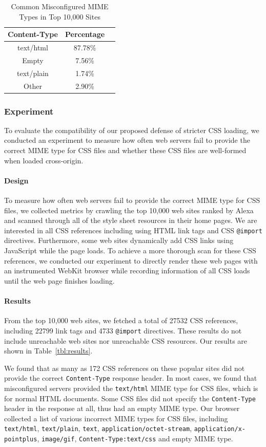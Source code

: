 \documentclass{acm_proc_article-sp}
\begin{document}
\begin{table}
\centering
\begin{tabular}{|c|c|c|} \hline
Content-Type&Percentage\\ \hline
text/html&87.78\%\\ \hline
Empty&7.56\%\\ \hline
text/plain&1.74\%\\ \hline
Other&2.90\%\\
\hline\end{tabular}
\caption{Common Misconfigured MIME Types in Top 10,000 Sites}
\label{table:MIME}
\end{table}

\subsubsection{Experiment}
To evaluate the compatibility of our proposed defense of stricter CSS loading, we conducted an experiment to measure how often web servers fail to provide the correct MIME type for CSS files and whether these CSS files are well-formed when loaded cross-origin.

\paragraph{Design}
To measure how often web servers fail to provide the correct MIME type for CSS files, we collected metrics by crawling the top 10,000 web sites ranked by Alexa\cite{alexa} and scanned through all of the style sheet resources in their home pages. We are interested in all CSS references including using HTML link tags and CSS \texttt{@import} directives. Furthermore, some web sites dynamically add CSS links using JavaScript while the page loads. To achieve a more thorough scan for these CSS references, we conducted our experiment to directly render these web pages with an instrumented WebKit browser while recording information of all CSS loads until the web page finishes loading.

\paragraph{Results}
From the top 10,000 web sites, we fetched a total of 27532 CSS references, including 22799 link tags and 4733 \texttt{@import} directives. These results do not include unreachable web sites nor unreachable CSS resources.
Our results are shown in Table~\ref{tbl:results}.

We found that as many as 172 CSS references on these popular sites did not provide the correct \texttt{Content-Type} response header. In most cases, we found that misconfigured servers provided the \texttt{text/html} MIME type for CSS files, which is for normal HTML documents. Some CSS files did not specify the \texttt{Content-Type} header in the response at all, thus had an empty MIME type. Our browser collected a list of various incorrect MIME types for CSS files, including \texttt{text/html}, \texttt{text/plain}, \texttt{text}, \texttt{application/octet-stream}, \texttt{application/x-pointplus}, \texttt{image/gif}, \texttt{Content-Type:text/css} and empty MIME type.
\end{document}
